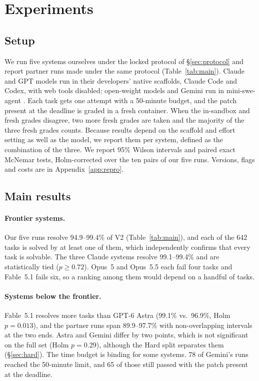 \section{Experiments}
\label{sec:experiments}

\subsection{Setup}
We run five systems ourselves under the locked protocol of \S\ref{sec:protocol} and report partner runs made under the same protocol (Table~\ref{tab:main}). Claude and GPT models run in their developers' native scaffolds, Claude Code and Codex, with web tools disabled; open-weight models and Gemini run in mini-swe-agent \citep{minisweagent2025}. Each task gets one attempt with a 50-minute budget, and the patch present at the deadline is graded in a fresh container. When the in-sandbox and fresh grades disagree, two more fresh grades are taken and the majority of the three fresh grades counts. Because results depend on the scaffold and effort setting as well as the model, we report them per system, defined as the combination of the three. We report 95\% Wilson intervals and paired exact McNemar tests, Holm-corrected over the ten pairs of our five runs. Versions, flags and costs are in Appendix~\ref{app:repro}.



\subsection{Main results}
\label{sec:main-results}
\paragraph{Frontier systems.} Our five runs resolve 94.9--99.4\% of V2 (Table~\ref{tab:main}), and each of the 642 tasks is solved by at least one of them, which independently confirms that every task is solvable. The three Claude systems resolve 99.1--99.4\% and are statistically tied ($p\geq0.72$). Opus~5 and Opus~5.5 each fail four tasks and Fable~5.1 fails six, so a ranking among them would depend on a handful of tasks.

\paragraph{Systems below the frontier.} Fable~5.1 resolves more tasks than GPT-6 Astra (99.1\% vs.\ 96.9\%, Holm $p=0.013$), and the partner runs span 89.9--97.7\% with non-overlapping intervals at the two ends. Astra and Gemini differ by two points, which is not significant on the full set (Holm $p=0.29$), although the Hard split separates them (\S\ref{sec:hard}). The time budget is binding for some systems. 78 of Gemini's runs reached the 50-minute limit, and 65 of those still passed with the patch present at the deadline.

